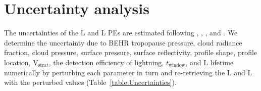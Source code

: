 \documentclass[amt]{copernicus}
\begin{document}
\section{Uncertainty analysis} \label{section:Uncertainties}

The uncertainties of the L and L PEs are estimated following \citet{Pickering.2016}, \citet{Allen.2019}, \citet{Bucsela.2019}, \citet{Laughner.2019}
and \citet{Lapierre.2020}.
We determine the uncertainty due to BEHR tropopause pressure, cloud radiance fraction, cloud pressure, surface pressure, surface reflectivity, profile shape, profile location, V$_\mathrm{strat}$, the detection efficiency of lightning, $t_\mathrm{window}$, and L lifetime numerically by perturbing each parameter in turn and re-retrieving the L and L with the perturbed values (Table~\ref{table:Uncertainties}).
\end{document}

